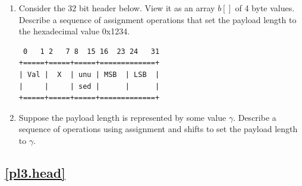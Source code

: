 \documentclass[12pt]{book}
\begin{document}
\begin{enumerate}[resume*]
\item Consider the 32 bit header below. View it as an array $b[]$ of 4 byte values. Describe a sequence of assignment operations that set the payload length to the hexadecimal value 0x1234.
 \begin{verbatim}
 0   1 2   7 8  15 16  23 24   31
+=====+=====+=====+=============+
| Val |  X  | unu | MSB  | LSB  |
|     |     | sed |      |      |
+=====+=====+=====+=============+ 
\end{verbatim}

 \item Suppose the payload length is represented by some value $\gamma$. Describe a sequence of operations using assignment and shifts to set the payload length to $\gamma$. 
\end{enumerate}


\subsection{\ref{pl3.head}}
\end{document}
